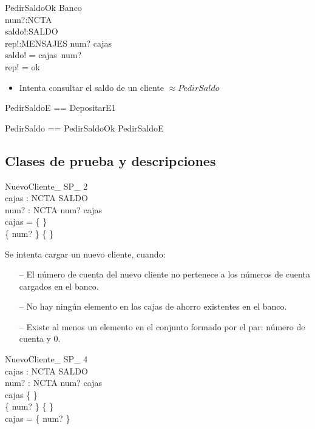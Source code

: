 \begin{schema}{PedirSaldoOk}
\Xi Banco \\
num?:NCTA \\
saldo!:SALDO \\
rep!:MENSAJES
\where
num? \in \dom cajas \\
saldo! = cajas~num? \\
rep! = ok
\end{schema}

\begin{itemize}
  \item Intenta consultar el saldo de un cliente $\approx PedirSaldo$ 
\end{itemize}

\begin{zed}
PedirSaldoE == DepositarE1 \also

PedirSaldo == PedirSaldoOk \lor PedirSaldoE
\end{zed}

\subsection*{Clases de prueba y descripciones}

\begin{schema}{NuevoCliente\_ SP\_ 2}\\
 cajas : NCTA \pfun SALDO \\
 num? : NCTA 
\where
 num? \notin \dom cajas \\
 cajas = \{ \} \\
 \{ num?  \} \neq \{ \}
\end{schema}

\begin{tcolorbox}[colback=gray!5!white,colframe=gray!50!black,
  colbacktitle=gray!75!black,title=NuevoCliente\_SP\_2]
  Se intenta cargar un nuevo cliente, cuando:
     \begin{itemize}
        \item[--]{El número de cuenta del nuevo cliente no pertenece a los números de cuenta cargados en el banco.}
        \item[--]{No hay ningún elemento en las cajas de ahorro existentes en el banco.}
        \item[--]{Existe al menos un elemento en el conjunto formado por el par: número de cuenta y 0.}
     \end{itemize}
\end{tcolorbox}


\begin{schema}{NuevoCliente\_ SP\_ 4}\\
 cajas : NCTA \pfun SALDO \\
 num? : NCTA 
\where
 num? \notin \dom cajas \\
 cajas \neq \{ \} \\
 \{ num?  \} \neq \{ \} \\
 \dom cajas = \dom \{ num?  \}
\end{schema}

